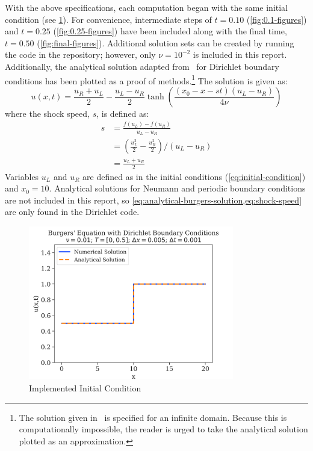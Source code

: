 With the above specifications, each computation began with the same initial condition (see \cref{fig:initial condition}).
For convenience, intermediate steps of $t=0.10$ (\cref{fig:0.1-figures}) and $t=0.25$ (\cref{fig:0.25-figures}) have been included along with the final time, $t=0.50$ (\cref{fig:final-figures}).
Additional solution sets can be created by running the code in the repository; however, only $\nu=10^{-2}$ is included in this report.
Additionally, the analytical solution adapted from~\autocite{cameronNOTESBURGERSEQUATION} for Dirichlet boundary conditions has been plotted as a proof of methods.\footnote{The solution given in~\autocite{cameronNOTESBURGERSEQUATION} is specified for an infinite domain. Because this is computationally impossible, the reader is urged to take the analytical solution plotted as an approximation.}
The solution is given as:
\begin{equation}
	\label{eq:analytical-burgers-solution}
	u(x,t)=\frac{u_R+u_L}{2}-\frac{u_L-u_R}{2}\tanh\left( \frac{\left( x_0-x-st\right)\left( u_L-u_R\right)    }{4\nu} \right)
\end{equation}
where the shock speed, $s$, is defined as:
\begin{equation}
	\label{eq:shock-speed}
	\begin{split}
		s&=\frac{f(u_L)-f(u_R)}{u_L-u_R}\\
		&=\left( \frac{u_L^2}{2}-\frac{u_R^2}{2} \right)/\left( u_L-u_R \right)\\
		&=\frac{u_L+u_R}{2}
	\end{split}
\end{equation}
Variables $u_L$ and $u_R$ are defined as in the initial conditions (\cref{eq:initial-condition}) and $x_0=10$.
Analytical solutions for Neumann and periodic boundary conditions are not included in this report, so \cref{eq:analytical-burgers-solution,eq:shock-speed} are only found in the Dirichlet code.
\begin{figure}
	\centering
	\includegraphics[width=0.8\textwidth]{../dirichlet_BC/images_nu=0.01/0_plot}
	\caption{Implemented Initial Condition}
	\label{fig:initial condition}
\end{figure}

